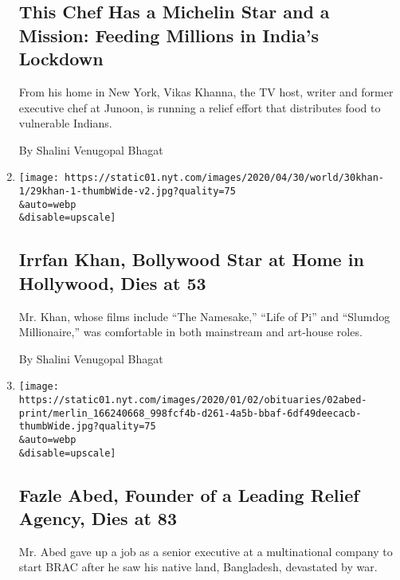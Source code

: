 \begin{enumerate}
  \hypertarget{this-chef-has-a-michelin-star-and-a-mission-feeding-millions-in-indias-lockdown}{%
  \subsection{This Chef Has a Michelin Star and a Mission: Feeding
  Millions in India's
  Lockdown}\label{this-chef-has-a-michelin-star-and-a-mission-feeding-millions-in-indias-lockdown}}

  From his home in New York, Vikas Khanna, the TV host, writer and
  former executive chef at Junoon, is running a relief effort that
  distributes food to vulnerable Indians.

  By Shalini Venugopal Bhagat
\item
  \href{/2020/04/29/movies/irrfan-khan-dead.html}{}

  \texttt{[image: https://static01.nyt.com/images/2020/04/30/world/30khan-1/29khan-1-thumbWide-v2.jpg?quality=75\\\&auto=webp\\\&disable=upscale]}

  \hypertarget{irrfan-khan-bollywood-star-at-home-in-hollywood-dies-at-53}{%
  \subsection{Irrfan Khan, Bollywood Star at Home in Hollywood, Dies at
  53}\label{irrfan-khan-bollywood-star-at-home-in-hollywood-dies-at-53}}

  Mr. Khan, whose films include ``The Namesake,'' ``Life of Pi'' and
  ``Slumdog Millionaire,'' was comfortable in both mainstream and
  art-house roles.

  By Shalini Venugopal Bhagat
\item
  \href{/2020/01/01/world/asia/fazle-hasan-abed-dead.html}{}

  \texttt{[image: https://static01.nyt.com/images/2020/01/02/obituaries/02abed-print/merlin\_166240668\_998fcf4b-d261-4a5b-bbaf-6df49deecacb-thumbWide.jpg?quality=75\\\&auto=webp\\\&disable=upscale]}

  \hypertarget{fazle-abed-founder-of-a-leading-relief-agency-dies-at-83}{%
  \subsection{Fazle Abed, Founder of a Leading Relief Agency, Dies at
  83}\label{fazle-abed-founder-of-a-leading-relief-agency-dies-at-83}}

  Mr. Abed gave up a job as a senior executive at a multinational
  company to start BRAC after he saw his native land, Bangladesh,
  devastated by war.


\end{enumerate}
